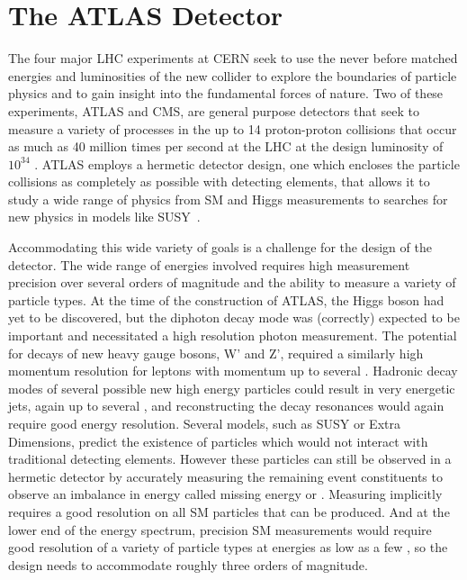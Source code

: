 \chapter{The ATLAS Detector}

\label{ch:atlas}

The four major \ac{LHC} experiments at \ac{CERN} seek to use the never before matched energies and luminosities of the new collider to explore the boundaries of particle physics and to gain insight into the fundamental forces of nature.
Two of these experiments, \ac{ATLAS} and \ac{CMS}, are general purpose detectors that seek to measure a variety of processes in the up to 14 \TeV proton-proton collisions that occur as much as 40 million times per second at the \ac{LHC} at the design luminosity of $10^{34}$ \lcms. 
\ac{ATLAS} employs a hermetic detector design, one which encloses the particle collisions as completely as possible with detecting elements, that allows it to study a wide range of physics from \ac{SM} and Higgs measurements to searches for new physics in models like \acl{SUSY}~\cite{atlas_experiment}.

Accommodating this wide variety of goals is a challenge for the design of the detector.
The wide range of energies involved requires high measurement precision over several orders of magnitude and the ability to measure a variety of particle types.
At the time of the construction of \ac{ATLAS}, the Higgs boson had yet to be discovered, but the diphoton decay mode was (correctly) expected to be important and necessitated a high resolution photon measurement.
The potential for decays of new heavy gauge bosons, W' and Z', required a similarly high momentum resolution for leptons with momentum up to several \TeV.
Hadronic decay modes of several possible new high energy particles could result in very energetic jets, again up to several \TeV, and reconstructing the decay resonances would again require good energy resolution.
Several models, such as \ac{SUSY} or Extra Dimensions, predict the existence of particles which would not interact with traditional detecting elements. 
However these particles can still be observed in a hermetic detector by accurately measuring the remaining event constituents to observe an imbalance in energy called missing energy or \met. 
Measuring \met implicitly requires a good resolution on all \ac{SM} particles that can be produced.
And at the lower end of the energy spectrum, precision \ac{SM} measurements would require good resolution of a variety of particle types at energies as low as a few \GeV, so the design needs to accommodate roughly three orders of magnitude.

